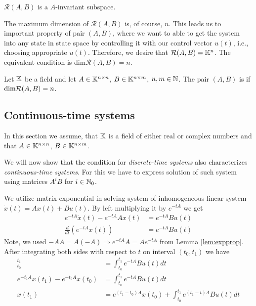 \begin{remark}
	\label{rem:reachinv}
	$\mathcal{R}(A,B)$ is a $A$-invariant subspace.
\end{remark} 

The maximum dimension of $\mathcal{R}(A,B)$ is, of course, $n$. This leads us to important property of pair $(A,B)$, where we want to able to get the system into any state in state space by controlling it with our control vector $u(t)$, i.e., choosing appropriate $u(t)$. Therefore, we desire that $\mathcal{R}(A,B)=\mathbb{K}^n$. The equivalent condition is $\text{dim}\mathcal{R}(A,B)=n$.

\begin{definition}
	Let $\mathbb{K}$ be a field and let $A \in \mathbb{K}^{n \times n}$, $B \in \mathbb{K}^{n \times m}$, $n,m \in \mathbb{N}$. The pair $(A,B)$ is  if $\textnormal{dim}\mathcal{R}(A,B)=n$.
\end{definition}

\subsection{Continuous-time systems}

\begin{remark}
	In this section we assume, that $\mathbb{K}$ is a field of either real or complex numbers and that $A\in\mathbb{K}^{n\times n}$, $B\in\mathbb{K}^{n\times m}$.
\end{remark}

We will now show that the condition for \textit{discrete-time systems} also characterizes \textit{continuous-time systems}. For this we have to express solution of such system using matrices $A^iB$ for $i\in \mathbb{N}_0$. 

We utilize matrix exponential in solving system of inhomogeneous linear system $\dot{x}(t)=Ax(t)+Bu(t)$. By left multiplying it by $e^{-tA}$ we get
\begin{align*}
	e^{-tA}\dot{x}(t)-e^{-tA}Ax(t) &=e^{-tA}Bu(t) \\
	\frac{d}{dt} (e^{-tA}x(t)) &=e^{-tA}Bu(t) 
\end{align*}
Note, we used $-AA=A(-A)\Rightarrow e^{-tA}A=Ae^{-tA}$ from Lemma \ref{lem:expprop}. After integrating both sides with respect to $t$ on interval $(t_0,t_1)$ we have 
\begin{align*}
	[e^{-tA}x(t)]^{t_1}_{t_0}&=\int^{t_1}_{t_0}e^{-tA}Bu(t)dt \\
	e^{-t_1A}x(t_1)-e^{-t_0A}x(t_0)&=\int^{t_1}_{t_0}e^{-tA}Bu(t)dt \\
	x(t_1)&=e^{(t_1-t_0)A}x(t_0)+\int^{t_1}_{t_0}e^{(t_1-t)A}Bu(t)dt
\end{align*}

